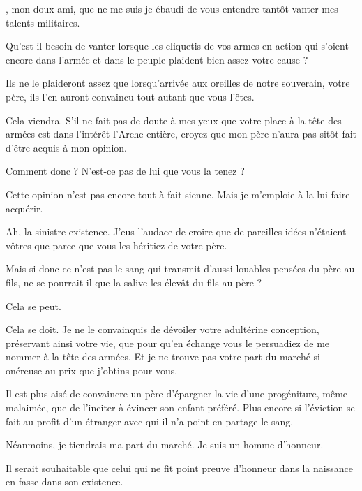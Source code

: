 \begin{drama}
  \generalspeaks \elena, mon doux ami, que ne me suis-je ébaudi de vous entendre tantôt vanter mes talents militaires.

  \elenaspeaks Qu’est-il besoin de vanter lorsque les cliquetis de vos armes en action qui s’oient encore dans l’armée et dans le peuple plaident bien assez votre cause ?

  \generalspeaks Ils  ne le plaideront assez que lorsqu’arrivée aux oreilles de notre souverain, votre père, ils l’en auront convaincu tout autant que vous l’êtes.

  \elenaspeaks Cela viendra. S’il ne fait pas de doute à mes yeux que votre place à la tête des armées est dans l’intérêt l’Arche entière, croyez que mon père n’aura pas sitôt fait d’être acquis à mon opinion.

  \generalspeaks Comment donc ? N’est-ce pas de lui que vous la tenez ?


  \elenaspeaks Cette opinion n’est pas encore tout à fait sienne. Mais je m’emploie à la lui faire acquérir.

  \generalspeaks 
  Ah, la sinistre existence. J’eus l’audace de croire que de pareilles idées n’étaient vôtres que parce que vous les héritiez de votre père.

  Mais si donc ce n’est pas le sang qui transmit d’aussi louables pensées du père au fils, ne se pourrait-il que la salive les élevât du fils au père ?

  \elenaspeaks Cela se peut.

  \generalspeaks Cela se doit. Je ne le convainquis de dévoiler votre adultérine conception, préservant ainsi votre vie, que pour qu’en échange vous le persuadiez de me nommer à la tête des armées. Et je ne trouve pas votre part du marché si onéreuse au prix que j’obtins pour vous.

  \elenaspeaks
  Il est plus aisé de convaincre un père d’épargner la vie d’une progéniture, même malaimée, que de l’inciter à évincer son enfant préféré. Plus encore si l’éviction se fait au profit d’un étranger avec qui il n’a point en partage le sang.

  Néanmoins, je tiendrais ma part du marché. Je suis un homme d’honneur.

  \generalspeaks Il serait souhaitable que celui qui ne fit point preuve d’honneur dans la naissance en fasse dans son existence.

\end{drama}

